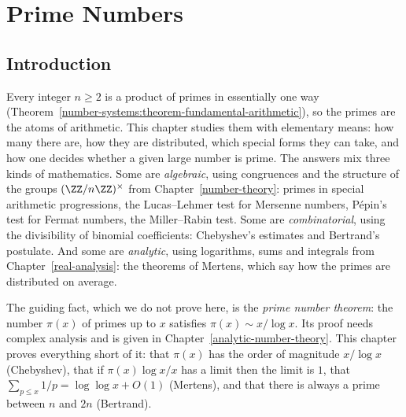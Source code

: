 \chapter{Prime Numbers}\label{prime-numbers}

\section{Introduction}\label{prime-numbers:section-introduction}

Every integer $n \geq 2$ is a product of primes in essentially one way (Theorem~\ref{number-systems:theorem-fundamental-arithmetic}), so the primes are the atoms of arithmetic. This
chapter studies them with elementary means: how many there are, how they are distributed, which special forms they can take, and how one decides whether a given large number is prime. The
answers mix three kinds of mathematics. Some are \emph{algebraic}, using congruences and the structure of the groups $(\ZZ/n\ZZ)^\times$ from Chapter~\ref{number-theory}: primes in special
arithmetic progressions, the Lucas--Lehmer test for Mersenne numbers, Pépin's test for Fermat numbers, the Miller--Rabin test. Some are \emph{combinatorial}, using the divisibility of
binomial coefficients: Chebyshev's estimates and Bertrand's postulate. And some are \emph{analytic}, using logarithms, sums and integrals from Chapter~\ref{real-analysis}: the theorems of
Mertens, which say how the primes are distributed on average.

The guiding fact, which we do not prove here, is the \emph{prime number theorem}: the number $\pi(x)$ of primes up to $x$ satisfies $\pi(x) \sim x/\log x$. Its proof needs complex analysis and
is given in Chapter~\ref{analytic-number-theory}. This chapter proves everything short of it: that $\pi(x)$ has the order of magnitude $x/\log x$ (Chebyshev), that if $\pi(x)\log x/x$ has a limit
then the limit is $1$, that $\sum_{p \leq x}1/p = \log\log x + O(1)$ (Mertens), and that there is always a prime between $n$ and $2n$ (Bertrand).

